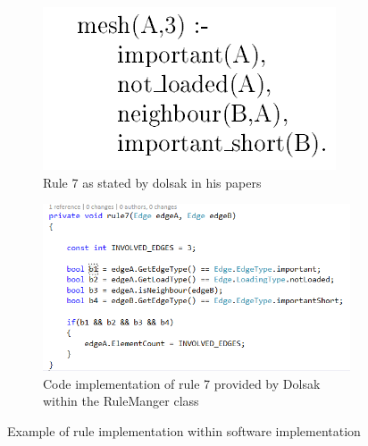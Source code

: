 \begin{figure}[H]

\begin{subfigure}{.5\textwidth}
  \centering
  \includegraphics[width=0.7\linewidth]{../Graphics/Rule7Dolsak.png}
  \caption{Rule 7 as stated by dolsak in his papers \cite{appOfILPToFEMeshDesign}}
  \label{fig:sub1}
\end{subfigure}%
\begin{subfigure}{.5\textwidth}
  \centering
  \includegraphics[width=0.9\linewidth]{../Graphics/Rule7Implementation.png}
  \caption{Code implementation of rule 7 provided by Dolsak within the RuleManger class}
  \label{fig:sub2}
\end{subfigure}
\label{fig:test}
\caption{Example of rule implementation within software implementation}
\end{figure}


